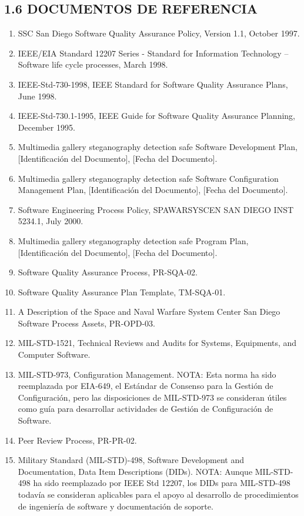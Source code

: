 \subsection{1.6 DOCUMENTOS DE REFERENCIA}
\begin{enumerate}
    \item SSC San Diego Software Quality Assurance Policy, Version 1.1, October 1997.
    \item IEEE/EIA Standard 12207 Series - Standard for Information Technology – Software life cycle processes, March 1998.
    \item IEEE-Std-730-1998, IEEE Standard for Software Quality Assurance Plans, June 1998.
    \item IEEE-Std-730.1-1995, IEEE Guide for Software Quality Assurance Planning, December 1995.
    \item Multimedia gallery steganography
detection safe Software Development Plan, [Identificación del Documento], [Fecha del Documento].
    \item Multimedia gallery steganography
detection safe Software Configuration Management Plan, [Identificación del Documento], [Fecha del Documento].
    \item Software Engineering Process Policy, SPAWARSYSCEN SAN DIEGO INST 5234.1, July 2000.
    \item Multimedia gallery steganography detection safe Program Plan, [Identificación del Documento], [Fecha del Documento].
    \item Software Quality Assurance Process, PR-SQA-02.
    \item Software Quality Assurance Plan Template, TM-SQA-01.
    \item A Description of the Space and Naval Warfare System Center San Diego Software Process Assets, PR-OPD-03.
    \item MIL-STD-1521, Technical Reviews and Audits for Systems, Equipments, and Computer Software.
    \item MIL-STD-973, Configuration Management. NOTA: Esta norma ha sido reemplazada por EIA-649, el Estándar de Consenso para la Gestión de Configuración, pero las disposiciones de MIL-STD-973 se consideran útiles como guía para desarrollar actividades de Gestión de Configuración de Software.
    \item Peer Review Process, PR-PR-02.
    \item Military Standard (MIL-STD)-498, Software Development and Documentation, Data Item Descriptions (DIDs). NOTA: Aunque MIL-STD-498 ha sido reemplazado por IEEE Std 12207, los DIDs para MIL-STD-498 todavía se consideran aplicables para el apoyo al desarrollo de procedimientos de ingeniería de software y documentación de soporte.

\end{enumerate}
